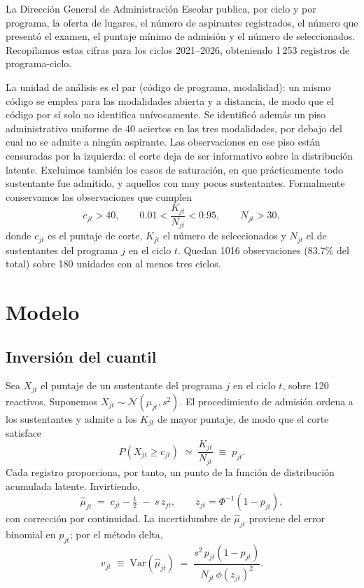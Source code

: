 \documentclass[aps,prd,reprint,amsmath,amssymb,nofootinbib,superscriptaddress]{revtex4-2}
\begin{document}
La Direcci\'on General de Administraci\'on Escolar publica, por ciclo y
por programa, la oferta de lugares, el n\'umero de aspirantes registrados,
el n\'umero que present\'o el examen, el puntaje m\'inimo de admisi\'on y
el n\'umero de seleccionados. Recopilamos estas cifras para los ciclos
2021--2026, obteniendo 1\,253 registros de programa-ciclo.

La unidad de an\'alisis es el par (c\'odigo de programa, modalidad): un
mismo c\'odigo se emplea para las modalidades abierta y a distancia, de
modo que el c\'odigo por s\'i solo no identifica un\'ivocamente. Se
identific\'o adem\'as un piso administrativo uniforme de 40 aciertos en
las tres modalidades, por debajo del cual no se admite a ning\'un
aspirante. Las observaciones en ese piso est\'an censuradas por la
izquierda: el corte deja de ser informativo sobre la distribuci\'on
latente. Excluimos tambi\'en los casos de saturaci\'on, en que
pr\'acticamente todo sustentante fue admitido, y aquellos con muy pocos
sustentantes. Formalmente conservamos las observaciones que cumplen
\begin{equation}
c_{jt} > 40, \qquad 0.01 < \frac{K_{jt}}{N_{jt}} < 0.95, \qquad N_{jt} > 30,
\end{equation}
donde $c_{jt}$ es el puntaje de corte, $K_{jt}$ el n\'umero de
seleccionados y $N_{jt}$ el de sustentantes del programa $j$ en el ciclo
$t$. Quedan 1016 observaciones ($83.7\%$ del total) sobre 180 unidades
con al menos tres ciclos.

\section{Modelo}\label{sec:modelo}

\subsection{Inversi\'on del cuantil}

Sea $X_{jt}$ el puntaje de un sustentante del programa $j$ en el ciclo
$t$, sobre 120 reactivos. Suponemos
$X_{jt}\sim\mathcal{N}(\mu_{jt},s^{2})$. El procedimiento de admisi\'on
ordena a los sustentantes y admite a los $K_{jt}$ de mayor puntaje, de
modo que el corte satisface
\begin{equation}
P\!\left(X_{jt}\ge c_{jt}\right)\;\simeq\;\frac{K_{jt}}{N_{jt}}\;\equiv\;p_{jt}.
\end{equation}
Cada registro proporciona, por tanto, un punto de la funci\'on de
distribuci\'on acumulada latente. Invirtiendo,
\begin{equation}
\widehat{\mu}_{jt} \;=\; c_{jt}-\tfrac12 \;-\; s\,z_{jt},
\qquad z_{jt}=\Phi^{-1}\!\left(1-p_{jt}\right),
\label{eq:inv}
\end{equation}
con correcci\'on por continuidad. La incertidumbre de
$\widehat{\mu}_{jt}$ proviene del error binomial en $p_{jt}$; por el
m\'etodo delta,
\begin{equation}
v_{jt}\;\equiv\;\mathrm{Var}\!\left(\widehat{\mu}_{jt}\right)
\;=\;\frac{s^{2}\,p_{jt}(1-p_{jt})}{N_{jt}\,\phi(z_{jt})^{2}} .
\end{equation}
\end{document}
